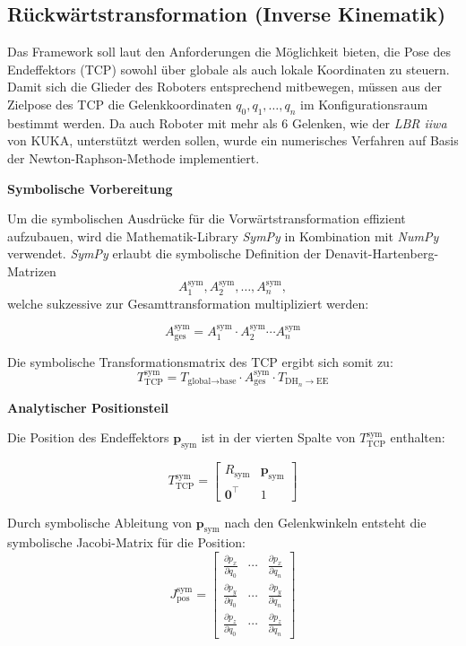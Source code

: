 \subsection{Rückwärtstransformation (Inverse Kinematik)}

Das Framework soll laut den Anforderungen die Möglichkeit bieten, die Pose des Endeffektors (TCP) sowohl über globale als auch lokale Koordinaten zu steuern.
Damit sich die Glieder des Roboters entsprechend mitbewegen, müssen aus der Zielpose des TCP die Gelenkkoordinaten $q_0, q_1, \dots, q_n$ im Konfigurationsraum bestimmt werden.
Da auch Roboter mit mehr als 6 Gelenken, wie der \textit{LBR iiwa} von KUKA, unterstützt werden sollen, wurde ein numerisches Verfahren auf Basis der Newton-Raphson-Methode implementiert.

\vspace{1em}
\noindent
\textbf{Symbolische Vorbereitung}

Um die symbolischen Ausdrücke für die Vorwärtstransformation effizient aufzubauen, wird die Mathematik-Library \textit{SymPy} in Kombination mit \textit{NumPy} verwendet.
\textit{SymPy} erlaubt die symbolische Definition der Denavit-Hartenberg-Matrizen
\[
A_1^{\text{sym}}, A_2^{\text{sym}}, \dots, A_n^{\text{sym}},
\]
welche sukzessive zur Gesamttransformation multipliziert werden:

\[
A_{\text{ges}}^{\text{sym}} = A_1^{\text{sym}} \cdot A_2^{\text{sym}} \cdots A_n^{\text{sym}}
\]

Die symbolische Transformationsmatrix des TCP ergibt sich somit zu:
\[
T_{\text{TCP}}^{\text{sym}} = T_{\text{global} \rightarrow \text{base}} \cdot A_{\text{ges}}^{\text{sym}} \cdot T_{\text{DH}_n \rightarrow \text{EE}}
\]

\vspace{1em}
\noindent
\textbf{Analytischer Positionsteil}

Die Position des Endeffektors $\mathbf{p}_{\text{sym}}$ ist in der vierten Spalte von $T_{\text{TCP}}^{\text{sym}}$ enthalten:

\[
T_{\text{TCP}}^{\text{sym}} =
\begin{bmatrix}
R_{\text{sym}} & \mathbf{p}_{\text{sym}} \\
\mathbf{0}^\top & 1
\end{bmatrix}
\]

Durch symbolische Ableitung von $\mathbf{p}_{\text{sym}}$ nach den Gelenkwinkeln entsteht die symbolische Jacobi-Matrix für die Position:
\[
J_{\text{pos}}^{\text{sym}} =
\begin{bmatrix}
\frac{\partial p_x}{\partial q_0} & \cdots & \frac{\partial p_x}{\partial q_n} \\
\frac{\partial p_y}{\partial q_0} & \cdots & \frac{\partial p_y}{\partial q_n} \\
\frac{\partial p_z}{\partial q_0} & \cdots & \frac{\partial p_z}{\partial q_n}
\end{bmatrix}
\]

